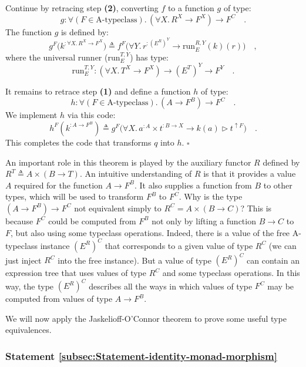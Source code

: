 Continue by retracing step \textbf{(2)}, converting $f$ to a function
$g$ of type:
\[
g:\forall(F\in\text{A-typeclass}).\,(\forall X.\,R^{X}\rightarrow F^{X})\rightarrow F^{C}\quad.
\]
The function $g$ is defined by:
\[
g^{F}\big(k^{:\forall X.\,R^{X}\rightarrow F^{X}}\big)\triangleq f^{F}\big(\forall Y.\,r^{:(E^{R})^{Y}}\rightarrow\text{run}_{E}^{R,Y}(k)(r)\big)\quad,
\]
where the universal runner ($\text{run}_{E}^{T,Y}$) has type:
\[
\text{run}_{E}^{T,Y}:(\forall X.\,T^{X}\rightarrow F^{X})\rightarrow(E^{T})^{Y}\rightarrow F^{Y}\quad.
\]

It remains to retrace step \textbf{(1)} and define a function $h$
of type:
\[
h:\forall(F\in\text{A-typeclass}).\,(A\rightarrow F^{B})\rightarrow F^{C}\quad.
\]
We implement $h$ via this code:
\[
h^{F}(k^{:A\rightarrow F^{B}})\triangleq g^{F}\big(\forall X.\,a^{:A}\times t^{:B\rightarrow X}\rightarrow k(a)\triangleright t^{\uparrow F}\big)\quad.
\]
This completes the code that transforms $q$ into $h$. $\square$

An important role in this theorem is played by the auxiliary functor
$R$ defined by $R^{T}\triangleq A\times(B\rightarrow T)$. An intuitive
understanding of $R$ is that it provides a value $A$ required for
the function $A\rightarrow F^{B}$. It also supplies a function from
$B$ to other types, which will be used to transform $F^{B}$ to $F^{C}$.
Why is the type $(A\rightarrow F^{B})\rightarrow F^{C}$ not equivalent
simply to $R^{C}=A\times(B\rightarrow C)$? This is because $F^{C}$
could be computed from $F^{B}$ not only by lifting a function $B\rightarrow C$
to $F$, but also using some typeclass operations. Indeed, there is
a value of the free A-typeclass instance $(E^{R})^{C}$ that corresponds
to a given value of type $R^{C}$ (we can just inject $R^{C}$ into
the free instance). But a value of type $(E^{R})^{C}$ can contain
an expression tree that uses values of type $R^{C}$ and some typeclass
operations. In this way, the type $(E^{R})^{C}$ describes all the
ways in which values of type $F^{C}$ may be computed from values
of type $A\rightarrow F^{B}$.

We will now apply the Jaskelioff-O\textsf{'}Connor theorem to prove some useful
type equivalences.

\subsubsection{Statement \label{subsec:Statement-identity-monad-morphism}\ref{subsec:Statement-identity-monad-morphism}}

